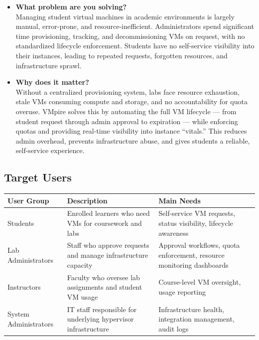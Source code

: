 \documentclass[12pt,letterpaper]{article}
\begin{document}
\begin{itemize}
  \item \textbf{What problem are you solving?}\\
    Managing student virtual machines in academic environments is largely manual, error-prone, and resource-inefficient. Administrators spend significant time provisioning, tracking, and decommissioning VMs on request, with no standardized lifecycle enforcement. Students have no self-service visibility into their instances, leading to repeated requests, forgotten resources, and infrastructure sprawl.

  \item \textbf{Why does it matter?}\\
    Without a centralized provisioning system, labs face resource exhaustion, stale VMs consuming compute and storage, and no accountability for quota overuse. VMpire solves this by automating the full VM lifecycle --- from student request through admin approval to expiration --- while enforcing quotas and providing real-time visibility into instance ``vitals.'' This reduces admin overhead, prevents infrastructure abuse, and gives students a reliable, self-service experience.
\end{itemize}

\subsection{Target Users}

\begin{tabularx}{\linewidth}{L{3.5cm} L{5cm} L{5.5cm}}
  \toprule
  \textbf{User Group} & \textbf{Description} & \textbf{Main Needs} \\
  \midrule
  Students & Enrolled learners who need VMs for coursework and labs & Self-service VM requests, status visibility, lifecycle awareness \\
  \addlinespace
  Lab Administrators & Staff who approve requests and manage infrastructure capacity & Approval workflows, quota enforcement, resource monitoring dashboards \\
  \addlinespace
  Instructors & Faculty who oversee lab assignments and student VM usage & Course-level VM oversight, usage reporting \\
  \addlinespace
  System Administrators & IT staff responsible for underlying hypervisor infrastructure & Infrastructure health, integration management, audit logs \\
  \bottomrule
\end{tabularx}
\end{document}
